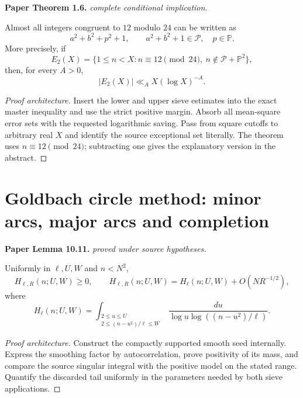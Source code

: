 \begin{theorem}
\label{goldbach_exceptional_set}
\leanok
\par\medskip\noindent\textbf{Paper Theorem 1.6.} \textit{complete conditional implication.}\par
Almost all integers congruent to $12$ modulo $24$ can be written as
\[
 a^2+b^2+p^2+1,
 \qquad a^2+b^2+1\in\mathcal P,\quad p\in\mathbb P.
\]
More precisely, if
\[
 E_2(X)=\{1\leq n<X:n\equiv12\pmod{24},\
 n\notin\mathcal P+\mathbb P^2\},
\]
then, for every $A>0$,
\[
 |E_2(X)|\ll_A X(\log X)^{-A}.
\]
\end{theorem}
\begin{proof}[Proof architecture]
\leanok
Insert the lower and upper sieve estimates into the exact master inequality and use the strict positive margin. Absorb all mean-square error sets with the requested logarithmic saving. Pass from square cutoffs to arbitrary real $X$ and identify the source exceptional set literally. The theorem uses $n\equiv12\pmod{24}$; subtracting one gives the explanatory version in the abstract.
\end{proof}

\section{Goldbach circle method: minor arcs, major arcs and completion}

\begin{lemma}
\label{goldbach_singular_integral}
\leanok
\par\medskip\noindent\textbf{Paper Lemma 10.11.} \textit{proved under source hypotheses.}\par
Uniformly in \(\ell,U,W\) and \(n<N^2\),
\[
 H_{\ell,R}(n;U,W)\geq0,
 \qquad
 H_{\ell,R}(n;U,W)
 =
 H_\ell(n;U,W)+O(NR^{-1/2}),
\]
where
\[
 H_\ell(n;U,W)
 =
 \int_{\substack{2\leq u\leq U\\
 2\leq(n-u^2)/\ell\leq W}}
 \frac{du}{\log u\log((n-u^2)/\ell)}.
\]
\end{lemma}
\begin{proof}[Proof architecture]
\leanok
Construct the compactly supported smooth seed internally. Express the smoothing factor by autocorrelation, prove positivity of its mass, and compare the source singular integral with the positive model on the stated range. Quantify the discarded tail uniformly in the parameters needed by both sieve applications.
\end{proof}

